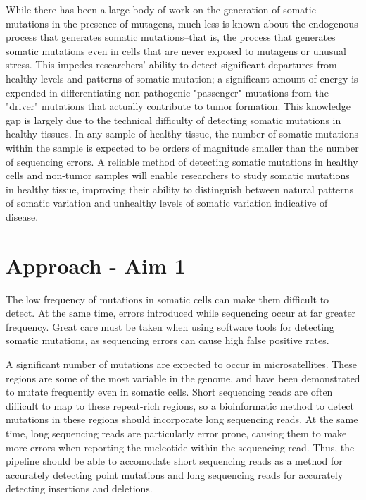 While there has been a large body of work on the generation of somatic mutations in the presence of mutagens, much less is known about the endogenous process that generates somatic mutations--that is, the process that generates somatic mutations even in cells that are never exposed to mutagens or unusual stress.
This impedes researchers' ability to detect significant departures from healthy levels and patterns of somatic mutation; a significant amount of energy is expended in differentiating non-pathogenic "passenger" mutations from the "driver" mutations that actually contribute to tumor formation.
This knowledge gap is largely due to the technical difficulty of detecting somatic mutations in healthy tissues.
In any sample of healthy tissue, the number of somatic mutations within the sample is expected to be orders of magnitude smaller than the number of sequencing errors.
A reliable method of detecting somatic mutations in healthy cells and non-tumor samples will enable researchers to study somatic mutations in healthy tissue, improving their ability to distinguish between natural patterns of somatic variation and unhealthy levels of somatic variation indicative of disease.



\section{Approach - Aim 1}
The low frequency of mutations in somatic cells can make them difficult to detect.
At the same time, errors introduced while sequencing occur at far greater frequency.
Great care must be taken when using software tools for detecting somatic mutations, as sequencing errors can cause high false positive rates.

A significant number of mutations are expected to occur in microsatellites.
These regions are some of the most variable in the genome, and have been demonstrated to mutate frequently even in somatic cells.
Short sequencing reads are often difficult to map to these repeat-rich regions, so a bioinformatic method to detect mutations in these regions should incorporate long sequencing reads. At the same time, long sequencing reads are particularly error prone, causing them to make more errors when reporting the nucleotide within the sequencing read. Thus, the pipeline should be able to accomodate short sequencing reads as a method for accurately detecting point mutations and long sequencing reads for accurately detecting insertions and deletions.


